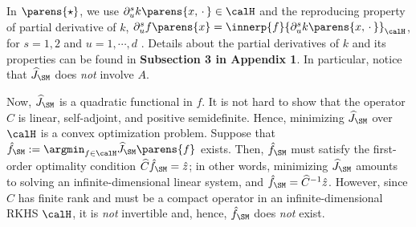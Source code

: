 \documentclass[12pt]{article}
\theoremstyle{definition}
\theoremstyle{theorem}
\theoremstyle{remark}
\begin{document}
In $\parens{\star}$, we use $\partial_u^s k \parens{x, \,\cdot\,} \in \calH$ and the reproducing property of partial derivative of $k$, $\partial_u^s f \parens{x} = \innerp{f}{\partial_u^s k \parens{x, \,\cdot\,}}_{\calH}$, for $s = 1, 2$ and $u = 1, \cdots, d$ \parencites{Zhou2008-jt}. Details about the partial derivatives of $k$ and its properties can be found in \textbf{\color{red}Subsection 3 in Appendix 1}. In particular, notice that $\widehat{J}_{\SM}$ does \textit{not} involve $A$. 

Now, $\widehat{J}_{\SM}$ is a quadratic functional in $f$. It is not hard to show that the operator $\widehat{C}$ is linear, self-adjoint, and positive semidefinite. Hence, minimizing $\widehat{J}_{\SM}$ over $\calH$ is a convex optimization problem. Suppose that $\hat{f}_{\SM} := \argmin_{f \in \calH} \widehat{J}_{\SM} \parens{f}$ exists. Then, $\hat{f}_{\SM}$ must satisfy the first-order optimality condition $\widehat{C} \hat{f}_{\SM} = \hat{z}$; in other words, minimizing $\widehat{J}_{\SM}$ amounts to solving an infinite-dimensional linear system, and $\hat{f}_{\SM} = \widehat{C}^{-1} \hat{z}$. However, since $\widehat{C}$ has finite rank and must be a compact operator in an infinite-dimensional RKHS $\calH$, it is \emph{not} invertible \parencites[Section 16.5 in][]{Royden2018-cd} and, hence, $\hat{f}_{\SM}$ does \textit{not} exist. 
\end{document}
